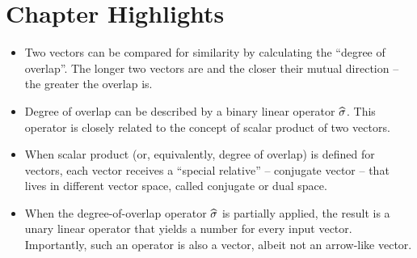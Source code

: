 \section*{Chapter Highlights}
{\chhc
  \it
\begin{itemize}
\item Two vectors can be compared for similarity by calculating the
  ``degree of overlap''. The longer two vectors are and the closer
  their mutual direction -- the greater the overlap is.
\item Degree of overlap can be described by a binary linear operator
  $\widehat{\sigma}$. This operator is closely related to the concept of
  scalar product of two vectors.
\item When scalar product (or, equivalently, degree of overlap) is
  defined for vectors, each vector receives a ``special relative'' --
  conjugate vector -- that lives in different vector space, called
  conjugate or dual space.
\item When the degree-of-overlap operator $\widehat{\sigma}$ is partially
  applied, the result is a unary linear operator that yields a number
  for every input vector. Importantly, such an operator is also a
  vector, albeit not an arrow-like vector.
\end{itemize}

}
